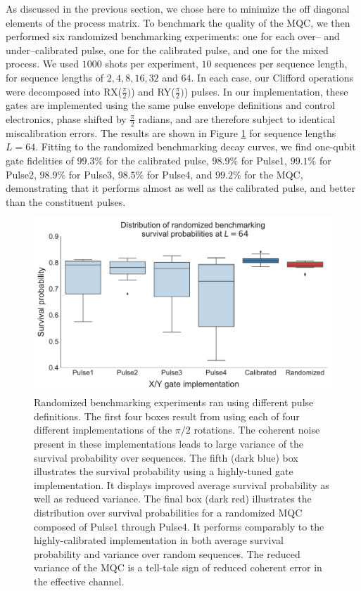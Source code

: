 \documentclass[aps,nofootinbib,pra,notitlepage,twocolumn]{revtex4-1}
\begin{document}
As discussed in the previous section, we chose here to minimize the off diagonal elements of the process matrix. To benchmark the quality of the MQC, we then performed six randomized benchmarking experiments\cite{Magesan2011}: one for each over-- and under--calibrated pulse, one for the calibrated pulse, and one for the mixed process. We used $1000$ shots per experiment, $10$ sequences per sequence length, for sequence lengths of $2, 4, 8, 16, 32$ and $64$. In each case, our Clifford operations were decomposed into RX($\frac{\pi}{2})$) and RY($\frac{\pi}{2})$) pulses. In our implementation, these gates are implemented using the same pulse envelope definitions and control electronics, phase shifted by $\frac{\pi}{2}$ radians, and are therefore subject to identical miscalibration errors. The results are shown in Figure \ref{fig:rb} for sequence lengths $L=64$. Fitting to the randomized benchmarking decay curves, we find one-qubit gate fidelities of $99.3\%$ for the calibrated pulse, $98.9\%$ for Pulse1, $99.1\%$ for Pulse2, $98.9\%$ for Pulse3, $98.5\%$ for Pulse4, and $99.2\%$ for the MQC, demonstrating that it performs almost as well as the calibrated pulse, and better than the constituent pulses. 
\begin{figure}[t]
  \centering
  \includegraphics[width=\columnwidth]{rb_data.pdf}
  \caption{Randomized benchmarking experiments ran using different pulse definitions. The first four boxes result from using each of four different implementations of the ${\pi/2}$ rotations. The coherent noise present in these implementations leads to large variance of the survival probability over sequences. The fifth (dark blue) box illustrates the survival probability using a highly-tuned gate implementation. It displays improved average survival probability as well as reduced variance. The final box (dark red) illustrates the distribution over survival probabilities for a randomized MQC composed of Pulse1 through Pulse4. It performs comparably to the highly-calibrated implementation in both average survival probability and variance over random sequences. The reduced variance of the MQC is a tell-tale sign of reduced coherent error in the effective channel. }
  \label{fig:rb}
\end{figure}
\end{document}
